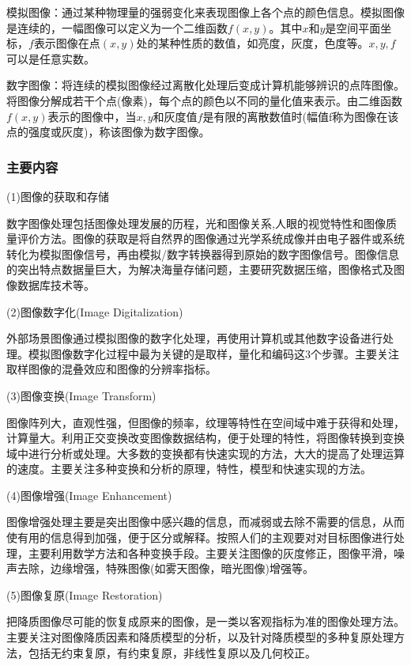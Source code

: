 \documentclass[11pt]{article}
\begin{document}
模拟图像：通过某种物理量的强弱变化来表现图像上各个点的颜色信息。模拟图像是连续的，一幅图像可以定义为一个二维函数$f(x,y)$。其中$x$和$y$是空间平面坐标，$f$表示图像在点$(x,y)$处的某种性质的数值，如亮度，灰度，色度等。$x,y,f$可以是任意实数。

数字图像：将连续的模拟图像经过离散化处理后变成计算机能够辨识的点阵图像。将图像分解成若干个点(像素)，每个点的颜色以不同的量化值来表示。由二维函数$f(x,y)$表示的图像中，当$x,y$和灰度值$f$是有限的离散数值时(幅值f称为图像在该点的强度或灰度)，称该图像为数字图像。

\subsubsection{主要内容}

(1)图像的获取和存储

数字图像处理包括图像处理发展的历程，光和图像关系,人眼的视觉特性和图像质量评价方法。图像的获取是将自然界的图像通过光学系统成像并由电子器件或系统转化为模拟图像信号，再由模拟/数字转换器得到原始的数字图像信号。图像信息的突出特点数据量巨大，为解决海量存储问题，主要研究数据压缩，图像格式及图像数据库技术等。

(2)图像数字化(Image Digitalization)

外部场景图像通过模拟图像的数字化处理，再使用计算机或其他数字设备进行处理。模拟图像数字化过程中最为关键的是取样，量化和编码这3个步骤。主要关注取样图像的混叠效应和图像的分辨率指标。

(3)图像变换(Image Transform)

图像阵列大，直观性强，但图像的频率，纹理等特性在空间域中难于获得和处理，计算量大。利用正交变换改变图像数据结构，便于处理的特性，将图像转换到变换域中进行分析或处理。大多数的变换都有快速实现的方法，大大的提高了处理运算的速度。主要关注多种变换和分析的原理，特性，模型和快速实现的方法。

(4)图像增强(Image Enhancement)

图像增强处理主要是突出图像中感兴趣的信息，而减弱或去除不需要的信息，从而使有用的信息得到加强，便于区分或解释。按照人们的主观要对对目标图像进行处理，主要利用数学方法和各种变换手段。主要关注图像的灰度修正，图像平滑，噪声去除，边缘增强，特殊图像(如雾天图像，暗光图像)增强等。

(5)图像复原(Image Restoration)

把降质图像尽可能的恢复成原来的图像，是一类以客观指标为准的图像处理方法。主要关注对图像降质因素和降质模型的分析，以及针对降质模型的多种复原处理方法，包括无约束复原，有约束复原，非线性复原以及几何校正。
\end{document}
